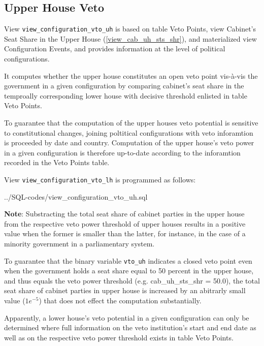\subsection{Upper House Veto}\label{view_configuration_vto_uh}
View \texttt{\footnotesize view\_configuration\_vto\_uh} is based on table Veto Points, view Cabinet's Seat Share in the Upper House (\ref{view_cab_uh_sts_shr}), and materialized view Configuration Events, and provides information at the level of political configurations.

It computes whether the upper house constitutes an open veto point vis-\`a-vis the government in a given configuration by comparing cabinet's seat share in the temproally corresponding lower house with decisive threshold enlisted in table Veto Points. 

To guarantee that the computation of the upper houses veto potential is sensitive to constitutional changes, joining poltitical configurations with veto inforamtion is proceeded by date and country. 
Computation of the upper house's veto power in a given configuration is therefore up-to-date according to the inforamtion recorded in the Veto Points table.

View \texttt{\footnotesize view\_configuration\_vto\_lh} is programmed as follows:

%
{../SQL-codes/view_configuration_vto_uh.sql}


{\bf Note}: 	Substracting the total seat share of cabinet parties in the upper house from the respective veto power threshold of upper houses results in a positive value when the former is smaller than the latter, for instance, in the case of a minority government in a parliamentary system.

To guarantee that the binary variable \texttt{\footnotesize vto\_uh} indicates a closed veto point even when the  government holds a seat share equal to 50 percent in the upper house, and thus equals the veto power threshold (e.g. cab\_uh\_sts\_shr = 50.0), the total seat share of cabinet parties in upper house is increased by an abitrarly small value ($1e^{-5}$) that does not effect the computation substantially.

Apparently, a lower house's veto potential in a given configuration can only be determined where full information on the veto institution's start and end date as well as on the respective veto power threshold exists in table Veto Points. 
